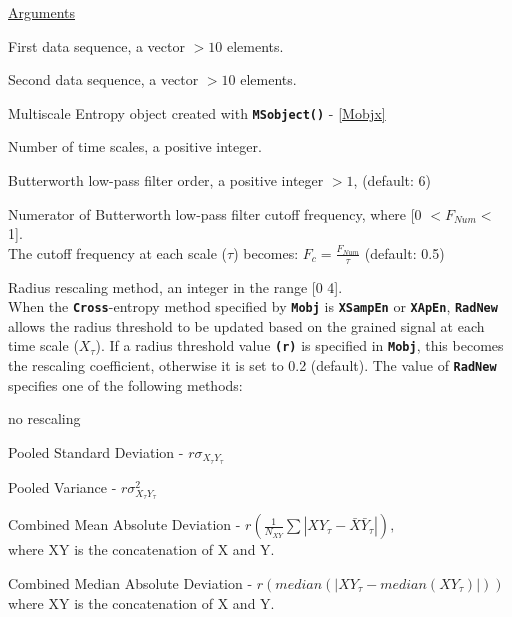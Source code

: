 \documentclass[12pt, a4paper, titlepage, openany]{book}
\begin{document}
\noindent \ul{Arguments}
\begin{description}[labelsep=1cm, labelwidth=2cm, nosep, style=multiline,leftmargin=3cm]\footnotesize
\item[\texttt{Sig1}]		First data sequence, a vector $>10$ elements.
\item[\texttt{Sig2}]		Second data sequence, a vector $>10$ elements.
\item[\texttt{Mobj}]	Multiscale Entropy object created with \texttt{\textbf{MSobject()}} - \ref{Mobjx}
\item[\texttt{Scales}]		Number of time scales, a positive integer.
\item[\texttt{F\_Order}]	 Butterworth low-pass filter order, a positive integer $ > 1$, (default: 6) 
\item[\texttt{F\_Num}]	 Numerator of Butterworth low-pass filter cutoff frequency, where [0 $ <  F_{Num} < $ 1]. \\
The cutoff frequency at each scale ($\tau$) becomes: $F_{c} = \frac{F_{Num}}{\tau}$  (default: 0.5)
\item[\texttt{RadNew}]			Radius rescaling method, an integer in the range [0 4].\\
				 When the \texttt{\textbf{Cross}}-entropy method specified by \texttt{\textbf{Mobj}} is \texttt{\textbf{XSampEn}} or \texttt{\textbf{XApEn}}, \texttt{\textbf{RadNew}} allows the radius threshold to be updated based on the grained signal at each time scale ($X_\tau$). If a radius threshold value \texttt{\textbf{(r)}} is specified in \texttt{\textbf{Mobj}},  this becomes the rescaling coefficient, otherwise it is set to 0.2 (default). The value of \texttt{\textbf{RadNew}} specifies one of the following methods:
	\begin{description}[labelsep=5em, labelwidth=4em, nosep,style=multiline,leftmargin=2cm]
		\item[0]	no rescaling
		\item[1]    Pooled Standard Deviation          - $r\sigma_{X_{\tau}Y_{\tau}}$
        \item[2]    Pooled Variance                    - $r\sigma_{X_{\tau}Y_{\tau}}^2$
        \item[3]    Combined Mean Absolute Deviation     - $r(\frac{1}{N_{XY}} \sum |XY_{\tau} - \bar{X}\bar{Y}_{\tau}|),$ \\ where XY is the concatenation of X and Y.
        \item[4]    Combined Median Absolute Deviation   - $r(median(|XY_{\tau} - median(XY_{\tau})|)) $  \\ where XY is the concatenation of X and Y.

\end{description}
\end{description}
\end{document}
